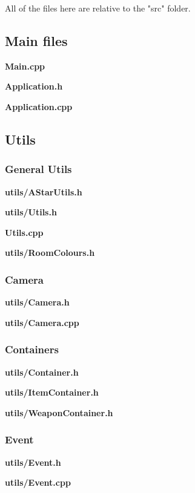 \documentclass[../Main.tex]{subfiles}
\begin{document}
    All of the files here are relative to the "src" folder.
    \subsection{Main files}
        \textbf{Main.cpp}
        
        \textbf{Application.h}
        
        \textbf{Application.cpp}
        
    \subsection{Utils}
        \subsubsection{General Utils}
            \textbf{utils/AStarUtils.h}
            

            \textbf{utils/Utils.h}
            
            \textbf{Utils.cpp}
            

            \textbf{utils/RoomColours.h}
            

        \subsubsection{Camera}
            \textbf{utils/Camera.h}
            
            \textbf{utils/Camera.cpp}
            

        \subsubsection{Containers}
            \textbf{utils/Container.h}
            
            \textbf{utils/ItemContainer.h}
            
            \textbf{utils/WeaponContainer.h}
            

        \subsubsection{Event}
            \textbf{utils/Event.h}
            
            \textbf{utils/Event.cpp}
            
\end{document}
